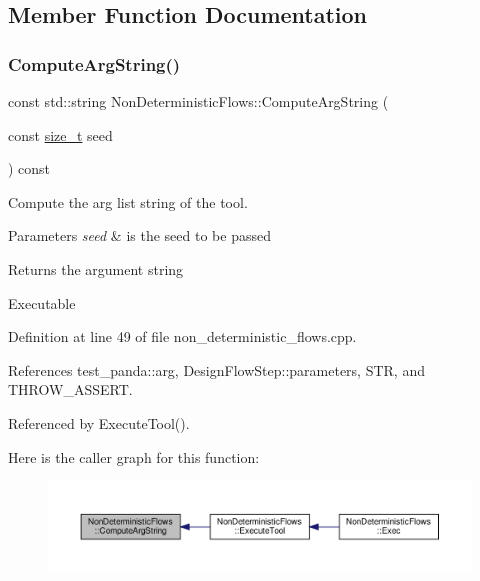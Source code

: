 \subsection{Member Function Documentation}
\mbox{\label{classNonDeterministicFlows_ad25c28fe042cb060d83c178de7cb533c}} 
\subsubsection{\texorpdfstring{Compute\+Arg\+String()}{ComputeArgString()}}
{\footnotesize\ttfamily const std\+::string Non\+Deterministic\+Flows\+::\+Compute\+Arg\+String (\begin{DoxyParamCaption}\item[{const \hyperlink{tutorial__fpt__2017_2intro_2sixth_2test_8c_a7c94ea6f8948649f8d181ae55911eeaf}{size\+\_\+t}}]{seed }\end{DoxyParamCaption}) const\hspace{0.3cm}{\ttfamily [private]}}



Compute the arg list string of the tool. 


\begin{DoxyParams}{Parameters}
{\em seed} & is the seed to be passed \\
\hline
\end{DoxyParams}
\begin{DoxyReturn}{Returns}
the argument string 
\end{DoxyReturn}
Executable 

Definition at line 49 of file non\+\_\+deterministic\+\_\+flows.\+cpp.



References test\+\_\+panda\+::arg, Design\+Flow\+Step\+::parameters, S\+TR, and T\+H\+R\+O\+W\+\_\+\+A\+S\+S\+E\+RT.



Referenced by Execute\+Tool().

Here is the caller graph for this function\+:
\nopagebreak
\begin{figure}[H]
\begin{center}
\leavevmode
\includegraphics[width=350pt]{dd/d17/classNonDeterministicFlows_ad25c28fe042cb060d83c178de7cb533c_icgraph}
\end{center}
\end{figure}
\mbox{\label{classNonDeterministicFlows_af018a9ea67d29631e1bb8eb489ac5154}} 

